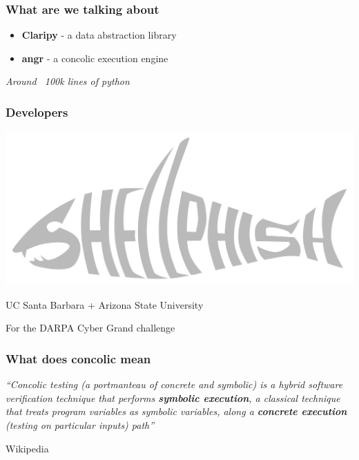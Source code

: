 \documentclass[aspectratio=169]{beamer}
\begin{document}
\begin{frame}[fragile]
	\frametitle{What are we talking about}
	\begin{itemize}
		\item \textbf{Claripy} - a data abstraction library
		\item \textbf{angr} - a concolic execution engine
	\end{itemize}
	\pause

	\vspace{3em}
	\emph{Around ~100k lines of python}
\end{frame}

\begin{frame}[fragile]
	\frametitle{Developers}
	\begin{center}
	\includegraphics[scale=0.25]{shellphish.png}
	\end{center}

	\vspace{2em}
	\begin{center}
	UC Santa Barbara + Arizona State University
	\end{center}

	\pause
	\vspace{2em}

	For the DARPA Cyber Grand challenge
\end{frame}

\begin{frame}[fragile]
	\frametitle{What does concolic mean}
	{
		\Large
		\emph{
		``Concolic testing (a portmanteau of concrete and symbolic) is a hybrid
		software verification technique that performs \textbf{symbolic
		execution}, a classical technique that treats program variables as
		symbolic variables, along a \textbf{concrete execution} (testing on
		particular inputs) path''
		}
		\begin{flushright}
			\small
			Wikipedia
		\end{flushright}
	}
\end{frame}
\end{document}
